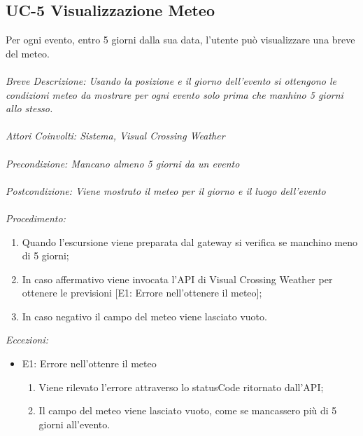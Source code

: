\subsection{UC-5 Visualizzazione Meteo}
Per ogni evento, entro 5 giorni dalla sua data, l'utente può visualizzare una breve del meteo.
\\
\\
\textit{Breve Descrizione: Usando la posizione e il giorno dell'evento si ottengono le condizioni meteo da mostrare per ogni evento solo prima che manhino 5 giorni allo stesso.} 
\\
\\
\textit{Attori Coinvolti: Sistema, Visual Crossing Weather}
\\
\\
\textit{Precondizione: Mancano almeno 5 giorni da un evento}
\\
\\
\textit{Postcondizione: Viene mostrato il meteo per il giorno e il luogo dell'evento}
\\
\\
\textit{Procedimento:}
\begin{enumerate}
	\item Quando l'escursione viene preparata dal gateway si verifica se manchino meno di 5 giorni;
	\item In caso affermativo viene invocata l'API di Visual Crossing Weather per ottenere le previsioni [E1: Errore nell'ottenere il meteo];
	\item In caso negativo il campo del meteo viene lasciato vuoto.
\end{enumerate}


\textit{Eccezioni:}
\begin{itemize}
	\item E1: Errore nell'ottenre il meteo
	\begin{enumerate}
		\item Viene rilevato l'errore attraverso lo statusCode ritornato dall'API;
		\item Il campo del meteo viene lasciato vuoto, come se mancassero più di 5 giorni all'evento.
	\end{enumerate}
\end{itemize}